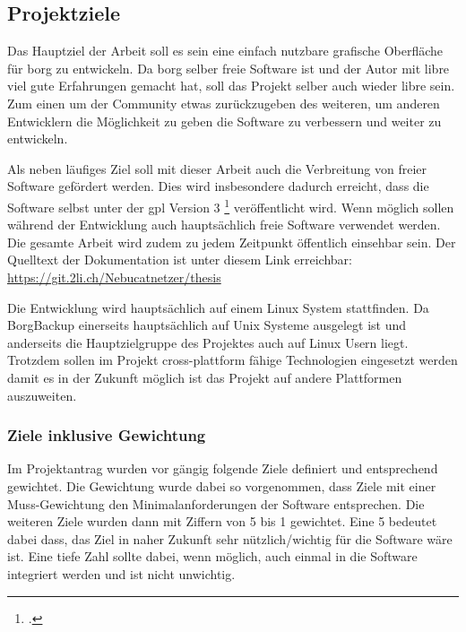 \subsection{Projektziele}
\label{sec:orge51f115}

Das Hauptziel der Arbeit soll es sein eine einfach nutzbare grafische
Oberfläche für \gls{borg} zu entwickeln. Da \gls{borg} selber freie Software ist und
der Autor mit \gls{libre} viel gute Erfahrungen gemacht hat, soll das Projekt
selber auch wieder \gls{libre} sein. Zum einen um der Community etwas
zurückzugeben des weiteren, um anderen Entwicklern die Möglichkeit zu geben die
Software zu verbessern und weiter zu entwickeln.

Als neben läufiges Ziel soll mit dieser Arbeit auch die Verbreitung von freier
Software gefördert werden. Dies wird insbesondere dadurch erreicht, dass die
Software selbst unter der \gls{gpl} Version 3 \footcite{gplv3}
veröffentlicht wird. Wenn möglich sollen während der Entwicklung auch
hauptsächlich freie Software verwendet werden. Die gesamte Arbeit wird zudem zu
jedem Zeitpunkt öffentlich einsehbar sein. Der Quelltext der Dokumentation ist
unter diesem Link erreichbar: \url{https://git.2li.ch/Nebucatnetzer/thesis}

Die Entwicklung wird hauptsächlich auf einem Linux System stattfinden. Da
BorgBackup einerseits hauptsächlich auf Unix Systeme ausgelegt ist und
anderseits die Hauptzielgruppe des Projektes auch auf Linux Usern liegt.
Trotzdem sollen im Projekt cross-plattform fähige Technologien eingesetzt werden
damit es in der Zukunft möglich ist das Projekt auf andere Plattformen
auszuweiten.

\subsubsection{Ziele inklusive Gewichtung}
\label{sec:org008e35c}

Im Projektantrag wurden vor gängig folgende Ziele definiert und entsprechend
gewichtet. Die Gewichtung wurde dabei so vorgenommen, dass Ziele mit einer
Muss-Gewichtung den Minimalanforderungen der Software entsprechen. Die weiteren
Ziele wurden dann mit Ziffern von 5 bis 1 gewichtet. Eine 5 bedeutet dabei
dass, das Ziel in naher Zukunft sehr nützlich/wichtig für die Software wäre
ist. Eine tiefe Zahl sollte dabei, wenn möglich, auch einmal in die Software
integriert werden und ist nicht unwichtig.

